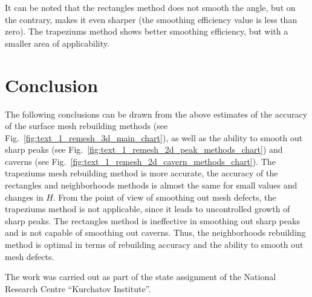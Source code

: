 \documentclass[
11pt,%
tightenlines,%
twoside,%
onecolumn,%
nofloats,%
nobibnotes,%
nofootinbib,%
superscriptaddress,%
noshowpacs,%
centertags]%
{revtex4}
\begin{document}
It can be noted that the rectangles method does not smooth the angle, but on the contrary, makes it even sharper (the smoothing efficiency value is less than zero).
The trapeziums method shows better smoothing efficiency, but with a smaller area of ​​applicability.


\section{Conclusion}

The following conclusions can be drawn from the above estimates of the accuracy of the surface mesh rebuilding methods (see Fig.~\ref{fig:text_1_remesh_3d_main_chart}), as well as the ability to smooth out sharp peaks (see Fig.~\ref{fig:text_1_remesh_2d_peak_methods_chart}) and caverns (see Fig.~\ref{fig:text_1_remesh_2d_cavern_methods_chart}).
The trapeziums mesh rebuilding method is more accurate, the accuracy of the rectangles and neighborhoods methods is almost the same for small values and changes in $H$.
From the point of view of smoothing out mesh defects, the trapeziums method is not applicable, since it leads to uncontrolled growth of sharp peaks.
The rectangles method is ineffective in smoothing out sharp peaks and is not capable of smoothing out caverns.
Thus, the neighborhoods rebuilding method is optimal in terms of rebuilding accuracy and the ability to smooth out mesh defects.


\begin{acknowledgments}
The work was carried out as part of the state assignment of the National Research Centre \textquotedblleft Kurchatov Institute\textquotedblright.

\end{acknowledgments}

%
%
\end{document}

